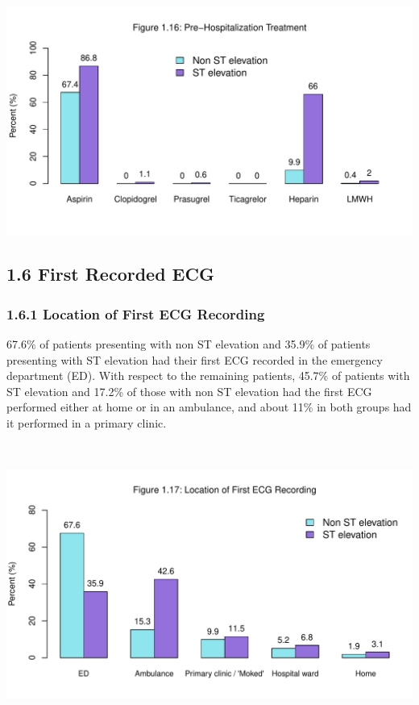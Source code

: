 \documentclass[
]{article}
\begin{document}
\includegraphics{‏‏ACSIS_2024_v1_with_trend_pdf_files/figure-latex/unnamed-chunk-54-1.pdf}

\pagebreak

\subsection{1.6 First Recorded ECG}\label{first-recorded-ecg}

\subsubsection{1.6.1 Location of First ECG
Recording}\label{location-of-first-ecg-recording}

67.6\% of patients presenting with non ST elevation and 35.9\% of
patients presenting with ST elevation had their first ECG recorded in
the emergency department (ED). With respect to the remaining patients,
45.7\% of patients with ST elevation and 17.2\% of those with non ST
elevation had the first ECG performed either at home or in an ambulance,
and about 11\% in both groups had it performed in a primary clinic.

~

\includegraphics{‏‏ACSIS_2024_v1_with_trend_pdf_files/figure-latex/unnamed-chunk-55-1.pdf}
\end{document}
